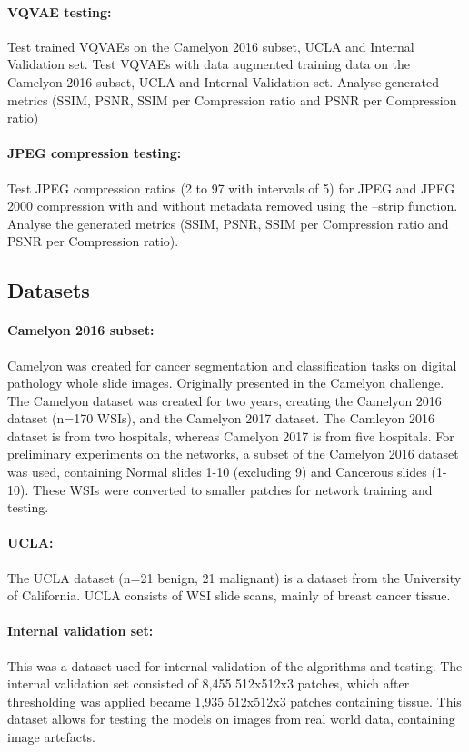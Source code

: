 \documentclass[review]{elsarticle}
\begin{document}
\paragraph{VQVAE testing:}
	Test trained VQVAEs on the Camelyon 2016 subset, UCLA and Internal Validation set.
	Test VQVAEs with data augmented training data on the Camelyon 2016 subset, UCLA and Internal Validation set.
	Analyse generated metrics (SSIM, PSNR, SSIM per Compression ratio and PSNR per Compression ratio)
\paragraph{JPEG compression testing:}
	Test JPEG compression ratios (2 to 97 with intervals of 5) for JPEG and JPEG 2000 compression with and without metadata removed using the --strip function.
	Analyse the generated metrics (SSIM, PSNR, SSIM per Compression ratio and PSNR per Compression ratio).

\subsection{Datasets}
\paragraph{Camelyon 2016 subset:} Camelyon was created for cancer segmentation and classification tasks on digital pathology whole slide images. Originally presented in the Camelyon challenge. The Camelyon dataset was created for two years, creating the Camelyon 2016 dataset (n=170 WSIs), and the Camelyon 2017 dataset. The Camleyon 2016 dataset is from two hospitals, whereas Camelyon 2017 is from five hospitals. For preliminary experiments on the networks, a subset of the Camelyon 2016 dataset was used, containing Normal slides 1-10 (excluding 9) and Cancerous slides (1-10). These WSIs were converted to smaller patches for network training and testing.

\paragraph{UCLA:} The UCLA dataset (n=21 benign, 21 malignant) is a dataset from the University of California. UCLA consists of WSI slide scans, mainly of breast cancer tissue.

\paragraph{Internal validation set:} This was a dataset used for internal validation of the algorithms and testing. The internal validation set consisted of 8,455 512x512x3 patches, which after thresholding was applied became 1,935 512x512x3 patches containing tissue. This dataset allows for testing the models on images from real world data, containing image artefacts.
\end{document}
